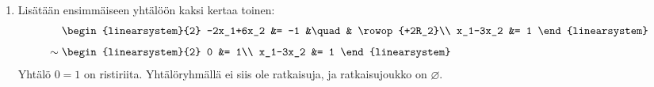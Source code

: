 \documentclass[11pt,a4paper]{amsart}
\begin{document}
\begin{solution}
\begin{enumerate}[label=\alph*), nosep]
\[\begin{aligned}
        \begin{linearsystem}{2}
          x_1 &= -1\\
          x_2 &= -1
        \end{linearsystem}
      \end{aligned}
    \]
    Yhtälöryhmällä on siten täsmälleen yksi ratkaisu, ja ratkaisujoukko on
    \[
      \left\{
      (-1,-1)\right\}.
    \]
    \begin{samepage}
      Graafisesti yhtälöt kuvaavat suoria
      \[
        x_2=\frac13x_1-\frac23
        \qquad\text{ja}\qquad
        x_2=-2x_1-3.
      \]
      Suorien kulmakertoimet ovat erisuuret, joten ne leikkaavat toisensa
      täsmälleen yhdessä pisteessä \((-1,-1)\).
      \begin{center}
      \end{center}
    \end{samepage}
  \item Lisätään ensimmäiseen yhtälöön kaksi kertaa toinen:
    \[
      \begin{aligned}
        &
        \begin{linearsystem}{2}
          -2x_1+6x_2 &= -1 &\quad& \rowop{+2R_2}\\
          x_1-3x_2 &= 1
        \end{linearsystem}\\[1ex]
        \sim{}&
        \begin{linearsystem}{2}
          0 &= 1\\
          x_1-3x_2 &= 1
        \end{linearsystem}
      \end{aligned}
    \]
    Yhtälö \(0=1\) on ristiriita. Yhtälöryhmällä ei siis ole ratkaisuja,
    ja ratkaisujoukko on \(\varnothing\).


\end{enumerate}
\end{solution}
\end{document}
